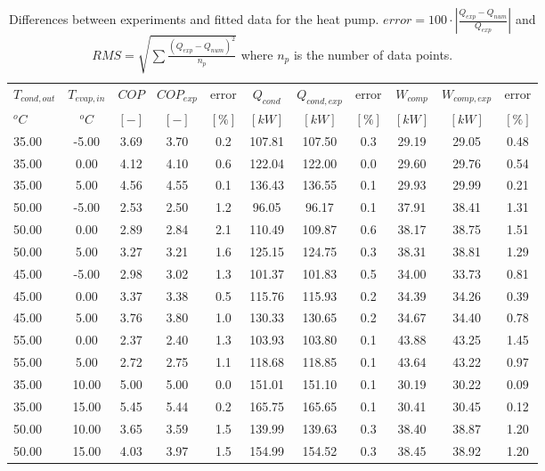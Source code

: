 \documentclass[english]{SPFShortReport}
\begin{document}
\begin{table}[!ht]
\begin{small}
\caption{Differences between experiments and fitted data for the heat pump.          $error=100 \cdot |\frac{Q_{exp}-Q_{num}}{Q_{exp}}|$ and $RMS = \sqrt { \sum{\frac{(Q_{exp}-Q_{num})^2}{n_p}} }$ where $n_p$ is the number of data points.}
\begin{center}
\resizebox{12cm}{!} 
{
\begin{tabular}{l | c c c c c c c c c c } 
\hline
\hline
$T_{cond,out}$ &$T_{evap,in}$ &$COP$ &$COP_{exp}$ &error &$Q_{cond}$ &$Q_{cond,exp}$ &error &$W_{comp}$ &$W_{comp,exp}$ &error \\ 
$^oC$ &$^oC$ &$[-]$ &$[-]$ &$[\%]$ &$[kW]$ &$[kW]$ &$[\%]$ &$[kW]$ &$[kW]$ &$[\%]$\\ 
\hline
35.00  & -5.00 & 3.69 & 3.70 & 0.2 & 107.81 & 107.50 & 0.3 & 29.19 & 29.05 & 0.48\\ 
35.00  & 0.00 & 4.12 & 4.10 & 0.6 & 122.04 & 122.00 & 0.0 & 29.60 & 29.76 & 0.54\\ 
35.00  & 5.00 & 4.56 & 4.55 & 0.1 & 136.43 & 136.55 & 0.1 & 29.93 & 29.99 & 0.21\\ 
50.00  & -5.00 & 2.53 & 2.50 & 1.2 & 96.05 & 96.17 & 0.1 & 37.91 & 38.41 & 1.31\\ 
50.00  & 0.00 & 2.89 & 2.84 & 2.1 & 110.49 & 109.87 & 0.6 & 38.17 & 38.75 & 1.51\\ 
50.00  & 5.00 & 3.27 & 3.21 & 1.6 & 125.15 & 124.75 & 0.3 & 38.31 & 38.81 & 1.29\\ 
45.00  & -5.00 & 2.98 & 3.02 & 1.3 & 101.37 & 101.83 & 0.5 & 34.00 & 33.73 & 0.81\\ 
45.00  & 0.00 & 3.37 & 3.38 & 0.5 & 115.76 & 115.93 & 0.2 & 34.39 & 34.26 & 0.39\\ 
45.00  & 5.00 & 3.76 & 3.80 & 1.0 & 130.33 & 130.65 & 0.2 & 34.67 & 34.40 & 0.78\\ 
55.00  & 0.00 & 2.37 & 2.40 & 1.3 & 103.93 & 103.80 & 0.1 & 43.88 & 43.25 & 1.45\\ 
55.00  & 5.00 & 2.72 & 2.75 & 1.1 & 118.68 & 118.85 & 0.1 & 43.64 & 43.22 & 0.97\\ 
35.00  & 10.00 & 5.00 & 5.00 & 0.0 & 151.01 & 151.10 & 0.1 & 30.19 & 30.22 & 0.09\\ 
35.00  & 15.00 & 5.45 & 5.44 & 0.2 & 165.75 & 165.65 & 0.1 & 30.41 & 30.45 & 0.12\\ 
50.00  & 10.00 & 3.65 & 3.59 & 1.5 & 139.99 & 139.63 & 0.3 & 38.40 & 38.87 & 1.20\\ 
50.00  & 15.00 & 4.03 & 3.97 & 1.5 & 154.99 & 154.52 & 0.3 & 38.45 & 38.92 & 1.20\\ 

\end{tabular}}
\end{center}
\end{small}
\end{table}
\end{document}
